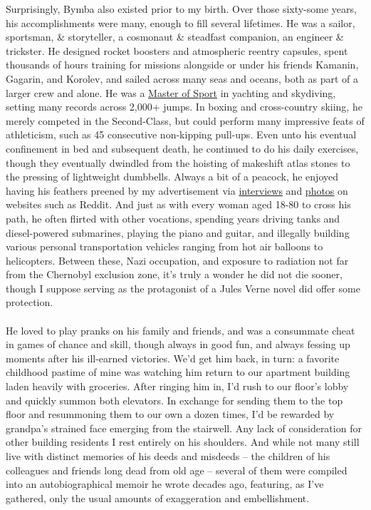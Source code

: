\documentclass[twoside,10pt]{article}
\begin{document}
\begin{article*}
Surprisingly, Bymba also existed prior to my birth. Over those sixty-some years, his accomplishments were many, enough to fill several lifetimes. He was a sailor, sportsman, \& storyteller, a cosmonaut \& steadfast companion, an engineer \& trickster. He designed rocket boosters and atmospheric reentry capsules, spent thousands of hours training for missions alongside or under his friends Kamanin, Gagarin, and Korolev, and sailed across many seas and oceans, both as part of a larger crew and alone. He was a \href{https://en.wikipedia.org/wiki/Unified_Sports_Classification_System_of_the_USSR_and_Russia#Athletes}{Master of Sport} in yachting and skydiving, setting many records across 2,000+ jumps. In boxing and cross-country skiing, he merely competed in the Second-Class, but could perform many impressive feats of athleticism, such as 45 consecutive non-kipping pull-ups. Even unto his eventual confinement in bed and subsequent death, he continued to do his daily exercises, though they eventually dwindled from the hoisting of makeshift atlas stones to the pressing of lightweight dumbbells. Always a bit of a peacock, he enjoyed having his feathers preened by my advertisement via \href{https://www.reddit.com/r/IAmA/comments/etu2s/i_was_born_in_shchigry_ru_in_1932_i_worked_as_a/}{interviews} and \href{https://www.reddit.com/r/OldSchoolCool/comments/8473rx/what_56_years_of_marriage_does_to_a_couple/}{photos} on websites such as Reddit. And just as with every woman aged 18-80 to cross his path, he often flirted with other vocations, spending years driving tanks and diesel-powered submarines, playing the piano and guitar, and illegally building various personal transportation vehicles ranging from hot air balloons to helicopters. Between these, Nazi occupation, and exposure to radiation not far from the Chernobyl exclusion zone, it’s truly a wonder he did not die sooner, though I suppose serving as the protagonist of a Jules Verne novel did offer some protection.
\\\\
He loved to play pranks on his family and friends, and was a consummate cheat in games of chance and skill, though always in good fun, and always fessing up moments after his ill-earned victories. We’d get him back, in turn: a favorite childhood pastime of mine was watching him return to our apartment building laden heavily with groceries. After ringing him in, I’d rush to our floor’s lobby and quickly summon both elevators. In exchange for sending them to the top floor and resummoning them to our own a dozen times, I’d be rewarded by grandpa’s strained face emerging from the stairwell. Any lack of consideration for other building residents I rest entirely on his shoulders. And while not many still live with distinct memories of his deeds and misdeeds – the children of his colleagues and friends long dead from old age – several of them were compiled into an autobiographical memoir he wrote decades ago, featuring, as I’ve gathered, only the usual amounts of exaggeration and embellishment.
\\


\end{article*}
\end{document}
